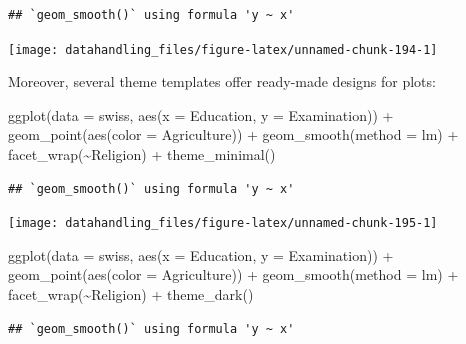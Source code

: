 \documentclass[
  12pt,
]{style/krantz}
\newenvironment{Shaded}{\begin{snugshade}}{\end{snugshade}}
\newcommand{\AttributeTok}[1]{\textcolor[rgb]{0.77,0.63,0.00}{#1}}
\newcommand{\FunctionTok}[1]{\textcolor[rgb]{0.00,0.00,0.00}{#1}}
\newcommand{\NormalTok}[1]{#1}
\newcommand{\SpecialCharTok}[1]{\textcolor[rgb]{0.00,0.00,0.00}{#1}}
\newcommand{\StringTok}[1]{\textcolor[rgb]{0.31,0.60,0.02}{#1}}
\begin{document}
\begin{verbatim}
## `geom_smooth()` using formula 'y ~ x'
\end{verbatim}

\texttt{[image: datahandling\_files/figure-latex/unnamed-chunk-194-1]}

Moreover, several theme templates offer ready-made designs for plots:

\begin{Shaded}
\begin{Highlighting}[]
\FunctionTok{ggplot}\NormalTok{(}\AttributeTok{data =}\NormalTok{ swiss, }\FunctionTok{aes}\NormalTok{(}\AttributeTok{x =}\NormalTok{ Education, }\AttributeTok{y =}\NormalTok{ Examination)) }\SpecialCharTok{+}
     \FunctionTok{geom\_point}\NormalTok{(}\FunctionTok{aes}\NormalTok{(}\AttributeTok{color =}\NormalTok{ Agriculture)) }\SpecialCharTok{+}
     \FunctionTok{geom\_smooth}\NormalTok{(}\AttributeTok{method =} \StringTok{\textquotesingle{}lm\textquotesingle{}}\NormalTok{) }\SpecialCharTok{+}
     \FunctionTok{facet\_wrap}\NormalTok{(}\SpecialCharTok{\textasciitilde{}}\NormalTok{Religion) }\SpecialCharTok{+}
     \FunctionTok{theme\_minimal}\NormalTok{()}
\end{Highlighting}
\end{Shaded}

\begin{verbatim}
## `geom_smooth()` using formula 'y ~ x'
\end{verbatim}

\texttt{[image: datahandling\_files/figure-latex/unnamed-chunk-195-1]}

\begin{Shaded}
\begin{Highlighting}[]
\FunctionTok{ggplot}\NormalTok{(}\AttributeTok{data =}\NormalTok{ swiss, }\FunctionTok{aes}\NormalTok{(}\AttributeTok{x =}\NormalTok{ Education, }\AttributeTok{y =}\NormalTok{ Examination)) }\SpecialCharTok{+}
     \FunctionTok{geom\_point}\NormalTok{(}\FunctionTok{aes}\NormalTok{(}\AttributeTok{color =}\NormalTok{ Agriculture)) }\SpecialCharTok{+}
     \FunctionTok{geom\_smooth}\NormalTok{(}\AttributeTok{method =} \StringTok{\textquotesingle{}lm\textquotesingle{}}\NormalTok{) }\SpecialCharTok{+}
     \FunctionTok{facet\_wrap}\NormalTok{(}\SpecialCharTok{\textasciitilde{}}\NormalTok{Religion) }\SpecialCharTok{+}
     \FunctionTok{theme\_dark}\NormalTok{()}
\end{Highlighting}
\end{Shaded}

\begin{verbatim}
## `geom_smooth()` using formula 'y ~ x'
\end{verbatim}
\end{document}
